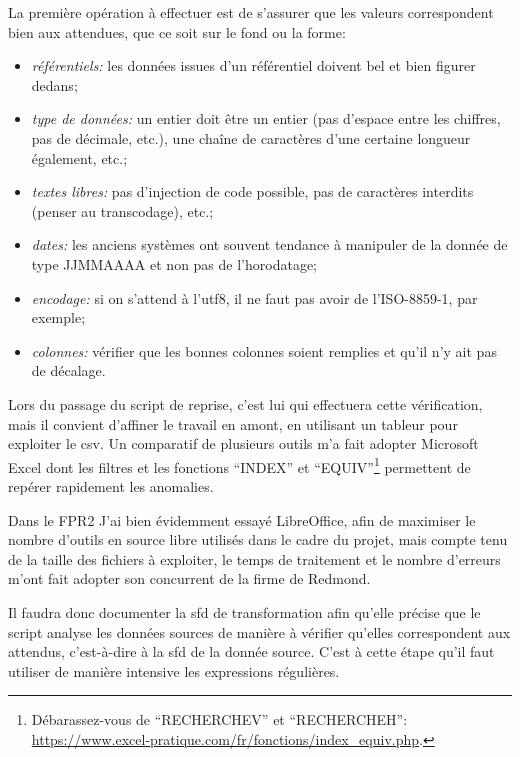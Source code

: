\documentclass{book}
\begin{document}
La première opération à effectuer est de s'assurer que les valeurs correspondent bien aux attendues, que ce soit sur le fond ou la forme:
\begin{itemize}
 \item \textit{référentiels:} les données issues d'un référentiel doivent bel et bien figurer dedans;
 \item \textit{type de données:} un entier doit être un entier (pas d'espace entre les chiffres, pas de décimale, etc.), une chaîne de caractères d'une certaine longueur également, etc.;
 \item \textit{textes libres:} pas d'injection de code possible, pas de caractères interdits (penser au transcodage), etc.;
 \item \textit{dates:} les anciens systèmes ont souvent tendance à manipuler de la donnée de type JJMMAAAA et non pas de l'horodatage;
 \item \textit{encodage:} si on s'attend à l'\gls{utf8}, il ne faut pas avoir de l'ISO-8859-1, par exemple;
 \item \textit{colonnes:} vérifier que les bonnes colonnes soient remplies et qu'il n'y ait pas de décalage.
\end{itemize}

Lors du passage du script de reprise, c'est lui qui effectuera cette vérification, mais il convient d'affiner le travail en amont, en utilisant un tableur pour exploiter le \gls{csv}. Un comparatif de plusieurs outils m'a fait adopter Microsoft Excel dont les filtres et les fonctions ``INDEX'' et ``EQUIV''\footnote{Débarassez-vous de ``RECHERCHEV'' et ``RECHERCHEH'': \url{https://www.excel-pratique.com/fr/fonctions/index_equiv.php}.} permettent de repérer rapidement les anomalies.

\begin{bclogo}[arrondi = 0.1, couleur = blue!10, logo = \bcinfo]{Dans le FPR2}
J'ai bien évidemment essayé LibreOffice, afin de maximiser le nombre d'outils en source libre utilisés dans le cadre du projet, mais compte tenu de la taille des fichiers à exploiter, le temps de traitement et le nombre d'erreurs m'ont fait adopter son concurrent de la firme de Redmond.
\end{bclogo}

Il faudra donc documenter la \gls{sfd} de transformation afin qu'elle précise que le script analyse les données sources de manière à vérifier qu'elles correspondent aux attendus, c'est-à-dire à la \gls{sfd} de la donnée source. C'est à cette étape qu'il faut utiliser de manière intensive les expressions régulières.
\end{document}
